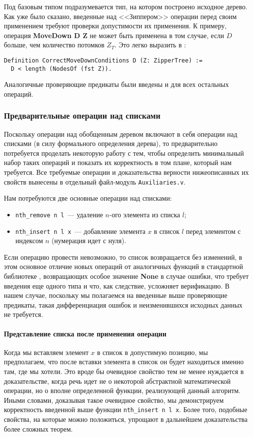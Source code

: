 Под базовым типом подразумевается тип, на котором построено исходное дерево. Как уже было сказано, введенные над <<Зиппером>> операции перед своим применением требуют проверки допустимости их применения. К примеру, операция \textbf{MoveDown D Z} не может быть применена в том случае, если $D$ больше, чем количество потомков $Z_T$. Это легко выразить в \tcoq:
\begin{Verbatim}[fontsize=\small]
Definition CorrectMoveDownConditions D (Z: ZipperTree) :=
  D < length (NodesOf (fst Z)).
\end{Verbatim}
Аналогичные проверяющие предикаты были введены и для всех остальных операций.

\subsubsection{Предварительные операции над списками}

Поскольку операции над обобщенным деревом включают в себя операции над списками (в силу формального определения дерева), то предварительно потребуется проделать некоторую работу с тем, чтобы определить минимальный набор таких операций и показать их корректность в том плане, который нам требуется. Все требуемые операции и доказательства верности нижеописанных их свойств вынесены в отдельный файл-модуль \texttt{Auxiliaries.v}.

Нам потребуются две основные операции над списками:
\begin{itemize}
\item \texttt{nth\_remove n l}~--- удаление $n$-ого элемента из списка $l$;
\item \texttt{nth\_insert n l x}~--- добавление элемента $x$ в список $l$ перед элементом с индексом $n$ (нумерация идет с нуля).
\end{itemize}

Если операцию провести невозможно, то список возвращается без изменений, в этом основное отличие новых операций от аналогичных функций в стандартной библиотеке \tcoq, возвращающих особое значение \textbf{None} в случае ошибки, что требует введения еще одного типа и что, как следствие, усложняет верификацию. В нашем случае, поскольку мы полагаемся на введенные выше проверяющие предикаты, такая дифференциация ошибок и неизменившихся исходных данных не требуется.

\paragraph{Представление списка после применения операции} Когда мы вставляем элемент $x$ в список в допустимую позицию, мы предполагаем, что после вставки элемента в список он будет находиться именно там, где мы хотели. Это вроде бы очевидное свойство тем не менее нуждается в доказательстве, когда речь идет не о некоторой абстрактной математической операции, но о вполне определенной функции, реализующей данный алгоритм. Иными словами, доказывая такое очевидное свойство, мы демонстрируем корректность введенной выше функции \texttt{nth\_insert n l x}. Более того, подобные свойства, на которые можно положиться, упрощают в дальнейшем доказательства более сложных теорем.

